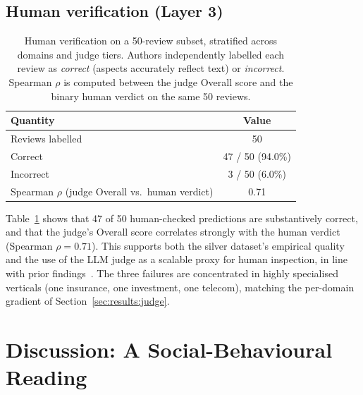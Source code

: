 \documentclass[runningheads]{llncs}
\begin{document}
\subsection{Human verification (Layer 3)}
\label{sec:results:human}

\begin{table}[!htbp]
\centering
\caption{Human verification on a 50-review subset, stratified across
domains and judge tiers. Authors independently labelled each review as
\textit{correct} (aspects accurately reflect text) or \textit{incorrect}.
Spearman $\rho$ is computed between the judge Overall score and the
binary human verdict on the same 50 reviews.}
\label{tab:human}
\renewcommand{\arraystretch}{1.1}
\setlength{\tabcolsep}{8pt}
\begin{tabular}{lc}
\toprule
\textbf{Quantity} & \textbf{Value} \\
\midrule
Reviews labelled                                    & 50 \\
Correct                                             & 47 / 50 (94.0\%) \\
Incorrect                                           & 3 / 50 (6.0\%) \\
Spearman $\rho$ (judge Overall vs.\ human verdict)  & 0.71 \\
\bottomrule
\end{tabular}
\end{table}

Table~\ref{tab:human} shows that 47 of 50 human-checked predictions are
substantively correct, and that the judge's Overall score correlates
strongly with the human verdict (Spearman $\rho = 0.71$). This supports
both the silver dataset's empirical quality and the use of the LLM judge
as a scalable proxy for human inspection, in line with prior
findings~\cite{10.5555/3666122.3668142}. The three failures are
concentrated in highly specialised verticals (one insurance, one
investment, one telecom), matching the per-domain gradient of
Section~\ref{sec:results:judge}.

\section{Discussion: A Social-Behavioural Reading}
\label{sec:discussion}
\end{document}
